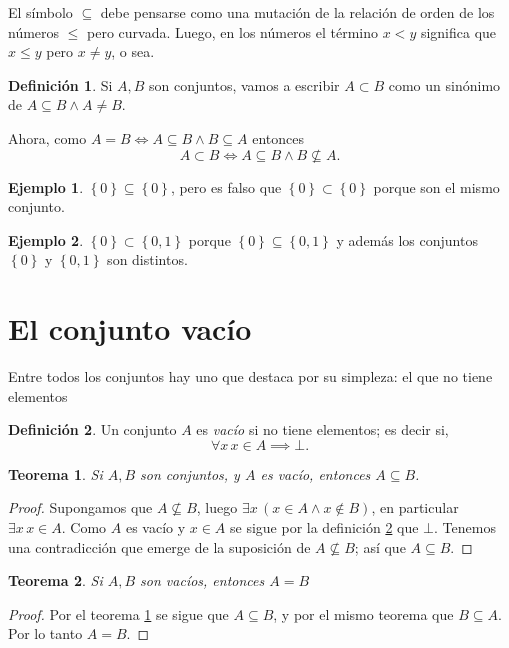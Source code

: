 \documentclass{book}
\newcommand{\set}[1]{\left\lbrace #1 \right\rbrace }
\newtheorem{thm}{Teorema}[chapter]
\theoremstyle{definition}
\newtheorem{df}{Definición}[chapter]
\newtheorem*{ejm}{Ejemplo}
\begin{document}
El símbolo $\subseteq$ debe pensarse como una mutación de la relación de orden de los números $\leq$ pero curvada.
Luego, en los números el término $x<y$ significa que $x\leq y$ pero $x \neq y$, o sea. 

\begin{df}
	Si $A,B$ son conjuntos, vamos a escribir $A \subset B$ como un sinónimo de $A \subseteq B \wedge A \neq B$.
\end{df}
Ahora, como $A = B \iff A \subseteq B \wedge B \subseteq A$ entonces
\begin{equation*}
	A \subset B \iff A \subseteq B \wedge B \not \subseteq A.
\end{equation*}

\begin{ejm}
	$\set{0} \subseteq \set{0}$, pero es falso que $\set{0} \subset \set{0}$ porque son el mismo conjunto.
\end{ejm}

\begin{ejm}
	$\set{0} \subset \set{0,1}$ porque $\set{0} \subseteq \set{0,1}$ y además los conjuntos $\set{0}$ y $\set{0,1}$ son distintos.
\end{ejm}

\section{El conjunto vacío}
Entre todos los conjuntos hay uno que destaca por su simpleza: el que no tiene elementos

\begin{df}\label{df_vacio}
	Un conjunto $A$ es \emph{vacío} si no tiene elementos; es decir si,
	\[\forall x\, x\in A \implies \bot.\]
\end{df}

\begin{thm}\label{thm_vacioContenido}
	Si $A,B$ son conjuntos, y $A$ es vacío, entonces $A\subseteq B$.
\end{thm}
\begin{proof}
	Supongamos que $A \not \subseteq B$, luego $\exists x\, \left(x\in A \wedge x \notin B \right)$, en particular $\exists x\, x\in A$.
	Como $A$ es vacío y $x\in A$ se sigue por la definición \ref{df_vacio} que $\bot$. 
	Tenemos una contradicción que emerge de la suposición de $A \not\subseteq B$; así que $A \subseteq B$.
\end{proof}
\begin{thm}
	Si $A,B$ son vacíos, entonces $A=B$
\end{thm}
\begin{proof}
	Por el teorema \ref{thm_vacioContenido} se sigue que $A\subseteq B$, y por el mismo teorema que $B\subseteq A$.
	Por lo tanto $A=B$.
\end{proof}
\end{document}
